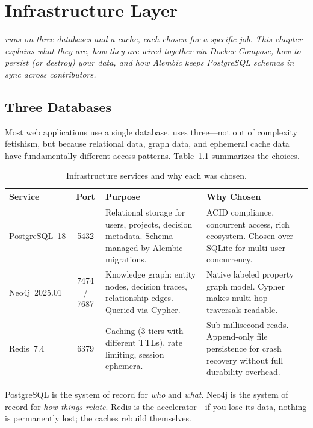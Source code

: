 \chapter{Infrastructure Layer}
\label{ch:infrastructure}

\textit{\sysname{} runs on three databases and a cache, each chosen for a
specific job.  This chapter explains what they are, how they are wired together
via Docker Compose, how to persist (or destroy) your data, and how Alembic
keeps PostgreSQL schemas in sync across contributors.}


\section{Three Databases}
\label{sec:three-databases}

Most web applications use a single database.  \sysname{} uses three---not out of
complexity fetishism, but because relational data, graph data, and ephemeral
cache data have fundamentally different access patterns.
Table~\ref{tab:database-overview} summarizes the choices.

\begin{table}[ht]
\centering
\caption{Infrastructure services and why each was chosen.}
\label{tab:database-overview}
\begin{tabularx}{\textwidth}{l c X l}
\toprule
\textbf{Service} & \textbf{Port} & \textbf{Purpose} & \textbf{Why Chosen} \\
\midrule
PostgreSQL~18 & 5432 &
    Relational storage for users, projects, decision metadata.
    Schema managed by Alembic migrations. &
    ACID compliance, concurrent access, rich ecosystem.
    Chosen over SQLite for multi-user concurrency. \\
\addlinespace
Neo4j~2025.01 & 7474 / 7687 &
    Knowledge graph: entity nodes, decision traces, relationship edges.
    Queried via Cypher. &
    Native labeled property graph model.
    Cypher makes multi-hop traversals readable. \\
\addlinespace
Redis~7.4 & 6379 &
    Caching (3 tiers with different TTLs), rate limiting,
    session ephemera. &
    Sub-millisecond reads.  Append-only file persistence for
    crash recovery without full durability overhead. \\
\bottomrule
\end{tabularx}
\end{table}

\begin{keyinsight}
PostgreSQL is the system of record for \emph{who} and \emph{what}.  Neo4j is the
system of record for \emph{how things relate}.  Redis is the accelerator---if you
lose its data, nothing is permanently lost; the caches rebuild themselves.
\end{keyinsight}


